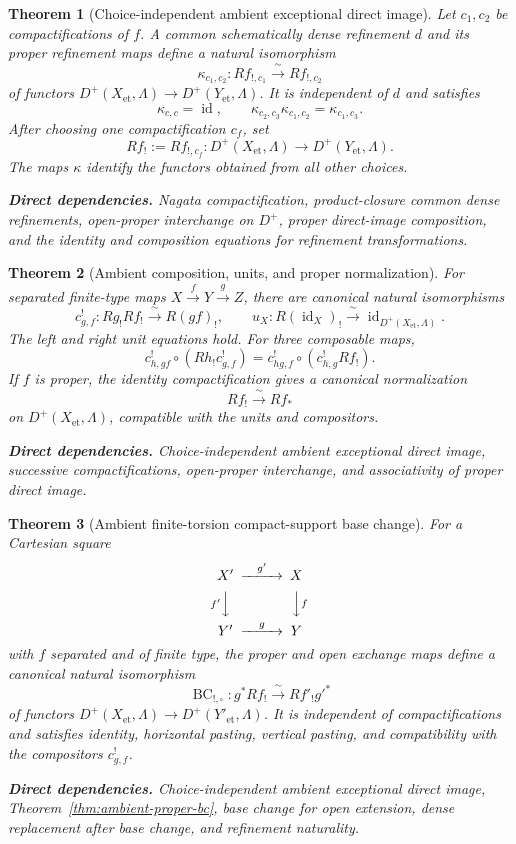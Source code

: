 \documentclass[10pt]{article}
\newtheorem{theorem}{Theorem}[section]
\theoremstyle{definition}
\newcommand{\deps}[1]{\par\smallskip\noindent\textbf{Direct dependencies.} #1}
\begin{document}
\begin{theorem}[Choice-independent ambient exceptional direct image]
\label{thm:ambient-shriek}
Let $c_1,c_2$ be compactifications of $f$.  A common schematically dense
refinement $d$ and its proper refinement maps define a natural isomorphism
\[
 \kappa_{c_1,c_2}:Rf_{!,c_1}\xrightarrow{\ \sim\ }Rf_{!,c_2}
\]
of functors $D^+(X_{\mathrm{et}},\Lambda)\to
D^+(Y_{\mathrm{et}},\Lambda)$.  It is independent of $d$ and satisfies
\[
 \kappa_{c,c}=\operatorname{id},\qquad
 \kappa_{c_2,c_3}\kappa_{c_1,c_2}=\kappa_{c_1,c_3}.
\]
After choosing one compactification $c_f$, set
\[
 Rf_!:=Rf_{!,c_f}:
 D^+(X_{\mathrm{et}},\Lambda)\longrightarrow
 D^+(Y_{\mathrm{et}},\Lambda).
\]
The maps $\kappa$ identify the functors obtained from all other choices.
\deps{Nagata compactification, product-closure common dense refinements,
open-proper interchange on $D^+$, proper direct-image composition, and the
identity and composition equations for refinement transformations.}
\end{theorem}

\begin{theorem}[Ambient composition, units, and proper normalization]
\label{thm:ambient-shriek-composition}
For separated finite-type maps $X\xrightarrow{f}Y\xrightarrow{g}Z$, there
are canonical natural isomorphisms
\[
 c^!_{g,f}:Rg_!Rf_!\xrightarrow{\ \sim\ }R(gf)_!,
 \qquad
 u_X:R(\operatorname{id}_X)_!\xrightarrow{\ \sim\ }
      \operatorname{id}_{D^+(X_{\mathrm{et}},\Lambda)}.
\]
The left and right unit equations hold.  For three composable maps,
\[
 c^!_{h,gf}\circ(Rh_!c^!_{g,f})
 =c^!_{hg,f}\circ(c^!_{h,g}Rf_!).
\]
If $f$ is proper, the identity compactification gives a canonical
normalization
\[
 Rf_!\xrightarrow{\ \sim\ }Rf_*
\]
on $D^+(X_{\mathrm{et}},\Lambda)$, compatible with the units and
compositors.
\deps{Choice-independent ambient exceptional direct image, successive
compactifications, open-proper interchange, and associativity of proper
direct image.}
\end{theorem}

\begin{theorem}[Ambient finite-torsion compact-support base change]
\label{thm:ambient-shriek-bc}
For a Cartesian square
\[
\begin{CD}
 X'@>{g'}>>X\\
 @V{f'}VV @VV{f}V\\
 Y'@>{g}>>Y
\end{CD}
\]
with $f$ separated and of finite type, the proper and open exchange maps
define a canonical natural isomorphism
\[
 \operatorname{BC}_{!,\square}:
 g^*Rf_!\xrightarrow{\ \sim\ }Rf'_!g'^*
\]
of functors
$D^+(X_{\mathrm{et}},\Lambda)\to D^+(Y'_{\mathrm{et}},\Lambda)$.
It is independent of compactifications and satisfies identity, horizontal
pasting, vertical pasting, and compatibility with the compositors
$c^!_{g,f}$.
\deps{Choice-independent ambient exceptional direct image,
Theorem~\ref{thm:ambient-proper-bc}, base change for open extension, dense
replacement after base change, and refinement naturality.}
\end{theorem}
\end{document}
